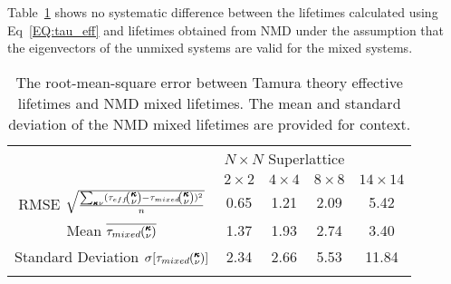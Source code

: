 \documentclass[aps,prb,preprint,preprintnumbers,amsmath,amssymb,floatfix,superscriptaddress]{revtex4}
\newcommand{\kv}{\mspace{-4.0mu}\left(\mspace{-8.0mu}
\begin{smallmatrix}&\pmb{\kappa} \\&\nu\end{smallmatrix}
\mspace{-3.0mu}\right)}
\begin{document}
Table~\ref{TB:taud} shows no systematic difference between the lifetimes calculated using Eq~\ref{EQ:tau_eff} and lifetimes obtained from NMD under the assumption that the eigenvectors of the unmixed systems are valid for the mixed systems.
\begin{table}
\begin{center}
\begin{tabular}{ccccc}
\hline\noalign{\smallskip}
&\multicolumn{3}{c}{$N\times N$ Superlattice} \\
\cline{2-5}\noalign{\smallskip}
\hspace{1cm} & $2\times2$ & $4\times4$ & $8\times8$ & $14\times14$  \\
\noalign{\smallskip}\hline\noalign{\smallskip}
RMSE $\sqrt{\frac{\sum_{\pmb{\kappa}\nu}(\tau_{eff}\kv-\tau_{mixed}\kv)^2}{n}}$ &0.65 & 1.21 & 2.09 & 5.42\\
Mean $\overline{\tau_{mixed}\kv}$ &1.37 & 1.93 & 2.74 & 3.40\\
Standard Deviation $\sigma[\tau_{mixed}\kv]$ &2.34 & 2.66 & 5.53 & 11.84\\
\noalign{\smallskip}\hline
\end{tabular}
\end{center}
\renewcommand{\table}{Table.}
\caption{The root-mean-square error between Tamura theory effective lifetimes and NMD mixed lifetimes. The mean and standard deviation of the NMD mixed lifetimes are provided for context. %
}
\label{TB:taud}
\end{table}
\end{document}
